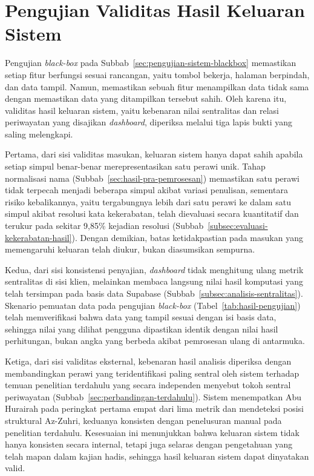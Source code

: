 \section{Pengujian Validitas Hasil Keluaran Sistem}
\label{sec:validitas-keluaran}
Pengujian \textit{black-box} pada Subbab~\ref{sec:pengujian-sistem-blackbox} memastikan setiap fitur berfungsi sesuai rancangan, yaitu tombol bekerja, halaman berpindah, dan data tampil. Namun, memastikan sebuah fitur menampilkan data tidak sama dengan memastikan data yang ditampilkan tersebut sahih. Oleh karena itu, validitas hasil keluaran sistem, yaitu kebenaran nilai sentralitas dan relasi periwayatan yang disajikan \textit{dashboard}, diperiksa melalui tiga lapis bukti yang saling melengkapi.

Pertama, dari sisi validitas masukan, keluaran sistem hanya dapat sahih apabila setiap simpul benar-benar merepresentasikan satu perawi unik. Tahap normalisasi nama (Subbab~\ref{sec:hasil-pra-pemrosesan}) memastikan satu perawi tidak terpecah menjadi beberapa simpul akibat variasi penulisan, sementara risiko kebalikannya, yaitu tergabungnya lebih dari satu perawi ke dalam satu simpul akibat resolusi kata kekerabatan, telah dievaluasi secara kuantitatif dan terukur pada sekitar 9,85\% kejadian resolusi (Subbab~\ref{subsec:evaluasi-kekerabatan-hasil}). Dengan demikian, batas ketidakpastian pada masukan yang memengaruhi keluaran telah diukur, bukan diasumsikan sempurna.

Kedua, dari sisi konsistensi penyajian, \textit{dashboard} tidak menghitung ulang metrik sentralitas di sisi klien, melainkan membaca langsung nilai hasil komputasi yang telah tersimpan pada basis data Supabase (Subbab~\ref{subsec:analisis-sentralitas}). Skenario pemuatan data pada pengujian \textit{black-box} (Tabel~\ref{tab:hasil-pengujian}) telah memverifikasi bahwa data yang tampil sesuai dengan isi basis data, sehingga nilai yang dilihat pengguna dipastikan identik dengan nilai hasil perhitungan, bukan angka yang berbeda akibat pemrosesan ulang di antarmuka.

Ketiga, dari sisi validitas eksternal, kebenaran hasil analisis diperiksa dengan membandingkan perawi yang teridentifikasi paling sentral oleh sistem terhadap temuan penelitian terdahulu yang secara independen menyebut tokoh sentral periwayatan (Subbab~\ref{sec:perbandingan-terdahulu}). Sistem menempatkan Abu Hurairah pada peringkat pertama empat dari lima metrik dan mendeteksi posisi struktural Az-Zuhri, keduanya konsisten dengan penelusuran manual pada penelitian terdahulu. Kesesuaian ini menunjukkan bahwa keluaran sistem tidak hanya konsisten secara internal, tetapi juga selaras dengan pengetahuan yang telah mapan dalam kajian hadis, sehingga hasil keluaran sistem dapat dinyatakan valid.


